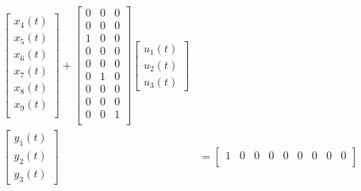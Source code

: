 \documentclass[12pt,a4paper]{article}
\begin{document}
\[\begin{aligned}
\begin{bmatrix}
                                        x_4(t) \\
                                        x_5(t) \\
                                        x_6(t) \\
                                        x_7(t) \\
                                        x_8(t) \\
                                        x_9(t) \\
                                    \end{bmatrix} + \begin{bmatrix}
                                                    0 & 0 & 0 \\
                                                    0 & 0 & 0 \\
                                                    1 & 0 & 0 \\
                                                    0 & 0 & 0 \\
                                                    0 & 0 & 0 \\
                                                    0 & 1 & 0 \\
                                                    0 & 0 & 0 \\
                                                    0 & 0 & 0 \\
                                                    0 & 0 & 1 \\
                                                \end{bmatrix} \begin{bmatrix}
                                                                u_1(t) \\
                                                                u_2(t) \\
                                                                u_3(t)
                                                            \end{bmatrix} \\
        \begin{bmatrix}
            y_1(t) \\
            y_2(t) \\
            y_3(t)
        \end{bmatrix} & = \begin{bmatrix}
                            1 & 0 & 0 & 0 & 0 & 0 & 0 & 0 & 0 \\

\end{bmatrix}
\end{aligned}\]
\end{document}
